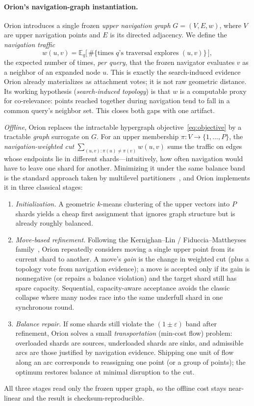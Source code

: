 \paragraph{Orion's navigation-graph instantiation.}
Orion introduces a single frozen \emph{upper navigation graph} $G=(V,E,w)$, where
$V$ are upper navigation points and $E$ is its directed adjacency. We define the
\emph{navigation traffic}
\begin{equation}
\label{eq:traffic}
w(u,v)=\mathbb{E}_{q}\bigl[\,\#\{\text{times $q$'s traversal explores }(u,v)\}\,\bigr],
\end{equation}
the expected number of times, \emph{per query}, that the frozen navigator
evaluates $v$ as a neighbor of an expanded node $u$. This is exactly the
search-induced evidence Orion already materializes as attachment votes; it is not
raw geometric distance. Its working hypothesis (\emph{search-induced topology}) is
that $w$ is a computable proxy for co-relevance: points reached together during
navigation tend to fall in a common query's neighbor set. This closes both gaps
with one artifact.

\emph{Offline}, Orion replaces the intractable hypergraph
objective~\eqref{eq:objective} by a tractable \emph{graph} surrogate on $G$.
For an upper membership $\pi:V\to\{1,\dots,P\}$, the
\emph{navigation-weighted cut}
$\sum_{(u,v):\pi(u)\neq\pi(v)}w(u,v)$ sums the traffic on edges whose endpoints
lie in different shards---intuitively, how often navigation would have to leave
one shard for another. Minimizing it under the same balance band is the standard
approach taken by multilevel partitioners~\cite{metis,kahypar}, and Orion
implements it in three classical stages:
\begin{enumerate}
\item \emph{Initialization.} A geometric $k$-means clustering of the upper
  vectors into $P$ shards yields a cheap first assignment that ignores graph
  structure but is already roughly balanced.
\item \emph{Move-based refinement.} Following the Kernighan--Lin /
  Fiduccia--Mattheyses family~\cite{kl1970,fm1982}, Orion repeatedly considers
  moving a single upper point from its current shard to another. A move's
  \emph{gain} is the change in weighted cut (plus a topology vote from
  navigation evidence); a move is accepted only if its gain is nonnegative (or
  repairs a balance violation) and the target shard still has spare capacity.
  Sequential, capacity-aware acceptance avoids the classic collapse where many
  nodes race into the same underfull shard in one synchronous round.
\item \emph{Balance repair.} If some shards still violate the
  $(1{\pm}\varepsilon)$ band after refinement, Orion solves a small
  \emph{transportation} (min-cost flow) problem: overloaded shards are sources,
  underloaded shards are sinks, and admissible arcs are those justified by
  navigation evidence. Shipping one unit of flow along an arc corresponds to
  reassigning one point (or a group of points); the optimum restores balance at
  minimal disruption to the cut.
\end{enumerate}
All three stages read only the frozen upper graph, so the offline cost stays
near-linear and the result is checksum-reproducible.

